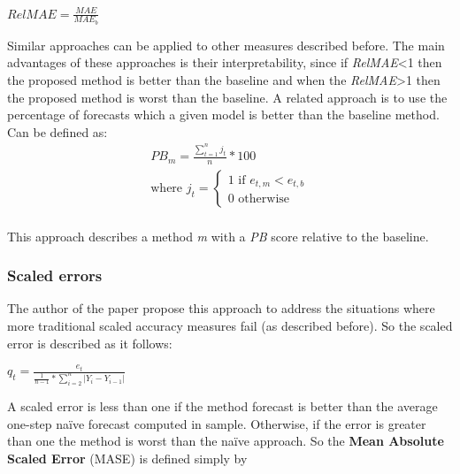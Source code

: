 \begin{center}
\Large
\begin{math}
  RelMAE = \frac{MAE}{MAE_b}
\end{math}
\normalsize
\end{center}

Similar approaches can be applied to other measures described before.
The main advantages of these approaches is their interpretability, since if
\emph{RelMAE}<1 then the proposed method is better than the baseline and when
the \emph{RelMAE}>1 then the proposed method is worst than the baseline.
A related approach is to use the percentage of forecasts which a given model is better than
the baseline method.\cite{Armstrong199269} Can be defined as:
\\

\Large
\begin{align*}
 PB_m=\frac{\sum\limits_{t=1}^n j_t}{n}*100\\ \text{where }j_t =
 \begin{cases}\text{1 if }e_{t,m} < e_{t,b}\\ \text{0 otherwise }\end{cases}
\end{align*}
\normalsize
\\

This approach describes a method \emph{m} with a \emph{PB} score relative to the
baseline.

\subsubsection{Scaled errors}

The author of the paper \cite{Hyndman2006679} propose this approach to address
the situations where more traditional scaled accuracy measures fail (as
described before). So the scaled error is described as it follows:

\begin{center}
\Large
\begin{math}
  q_t = \frac{e_t}{\frac{1}{n-1}*\sum\limits_{i=2}^n\left|Y_i - Y_{i-1}\right|}
\end{math}
\normalsize
\end{center}

A scaled error is less than one if the method forecast is better than the
average one-step na\"{i}ve forecast computed in sample. Otherwise, if the error
is greater than one the method is worst than the na\"{i}ve approach.
So the \textbf{Mean Absolute Scaled Error} (MASE) is defined simply by

